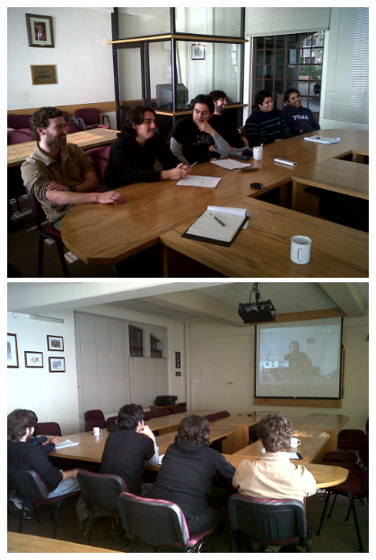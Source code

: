 \begin{center}
\includegraphics[width=0.8\textwidth]{images/leads1}\\\vspace{1cm}
\includegraphics[width=0.8\textwidth]{images/leads2}
\end{center}

\newpage
